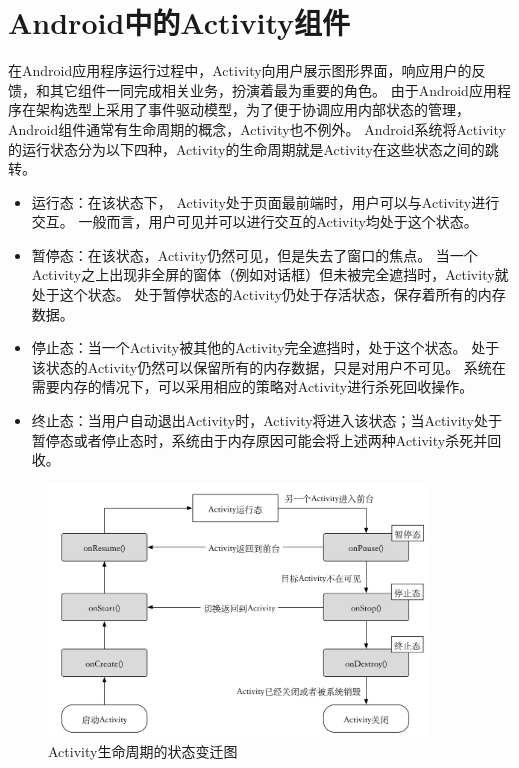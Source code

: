 \section{Android中的Activity组件}



在Android应用程序运行过程中，Activity向用户展示图形界面，响应用户的反馈，和其它组件一同完成相关业务，扮演着最为重要的角色。%
由于Android应用程序在架构选型上采用了事件驱动模型，为了便于协调应用内部状态的管理，Android组件通常有生命周期的概念，Activity也不例外。
Android系统将Activity的运行状态分为以下四种，Activity的生命周期就是Activity在这些状态之间的跳转。



\begin{itemize}
		\setlength{\itemsep}{-5pt}
		
	\item 运行态：在该状态下， Activity处于页面最前端时，用户可以与Activity进行交互。
	一般而言，用户可见并可以进行交互的Activity均处于这个状态。
	
	\item 暂停态：在该状态，Activity仍然可见，但是失去了窗口的焦点。
	当一个Activity之上出现非全屏的窗体（例如对话框）但未被完全遮挡时，Activity就处于这个状态。
	处于暂停状态的Activity仍处于存活状态，保存着所有的内存数据。%

	\item 停止态：当一个Activity被其他的Activity完全遮挡时，处于这个状态。
	处于该状态的Activity仍然可以保留所有的内存数据，只是对用户不可见。
	系统在需要内存的情况下，可以采用相应的策略对Activity进行杀死回收操作。
	
	\item 终止态：当用户自动退出Activity时，Activity将进入该状态；当Activity处于暂停态或者停止态时，系统由于内存原因可能会将上述两种Activity杀死并回收。
\end{itemize}



\begin{figure}[!ht]
	\centering
	\includegraphics[width=0.9\textwidth]{./Figures/Activity-lifecycle-Landscape.png}
	
	\caption{Activity生命周期的状态变迁图}
	\label{fig:Activity-lifecycle}
\end{figure}

